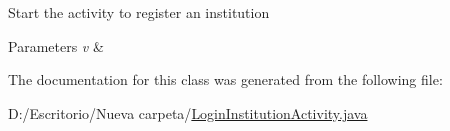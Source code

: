 Start the activity to register an institution 
\begin{DoxyParams}{Parameters}
{\em v} & \\
\hline
\end{DoxyParams}


The documentation for this class was generated from the following file\+:\begin{DoxyCompactItemize}
\item 
D\+:/\+Escritorio/\+Nueva carpeta/\mbox{\hyperlink{_login_institution_activity_8java}{Login\+Institution\+Activity.\+java}}\end{DoxyCompactItemize}
